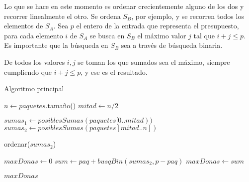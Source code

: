 Lo que se hace en este momento es ordenar crecientemente alguno de los dos y
recorrer linealmente el otro. Se ordena $S_B$, por ejemplo, y se recorren todos
los elementos de $S_A$. Sea $p$ el entero de la entrada que representa el
presupuesto, para cada elemento $i$ de $S_A$ se busca en $S_B$ el máximo valor
$j$ tal que $i + j \leq p$. Es importante que la búsqueda en $S_B$ sea a través
de búsqueda binaria.

De todos los valores $i,j$ se toman los que sumados sea el máximo, siempre
cumpliendo que $i + j \leq p$, y ese es el resultado.

\bigskip

\begin{algorithm}[H]
	\caption{Algoritmo principal}
    $n \gets paquetes$.tamaño() \;
	$mitad \gets n / 2$ \;

	$sumas_1 \gets posiblesSumas(paquetes[0..mitad))$ \;
	$sumas_2 \gets posiblesSumas(paquetes[mitad..n])$ \;

	ordenar($sumas_2$) \;

	$maxDonas \gets 0$ \;
	 {
		 {
			$sum \gets paq + busqBin(sumas_2, p - paq)$ \;
			 {
				$maxDonas \gets sum$ \;
			}
		}
	}

	\Return $maxDonas$ \;
\end{algorithm}